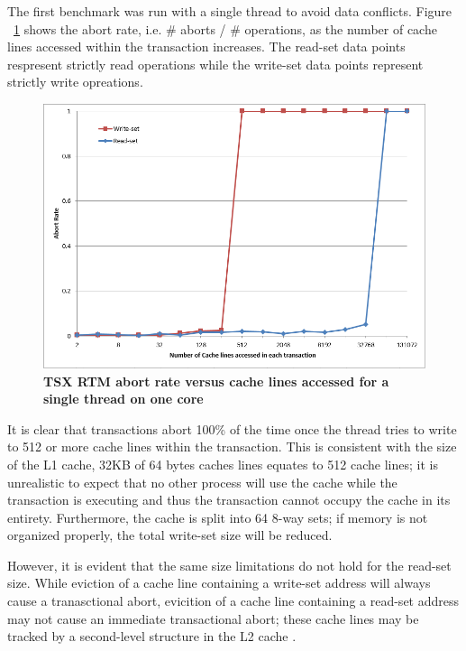 \documentclass[a4paper]{article}
\begin{document}
\indent
The first benchmark was run with a single thread to avoid data conflicts.  Figure
~\ref{fig:trx_size} shows the abort rate, i.e. \# aborts / \# operations, as the
number of cache lines accessed within the transaction increases.  The read-set
data points respresent strictly read operations while the write-set data points
represent strictly write opreations.
\par 

\begin{figure}[H]
    \centering
    \graphicspath{ {./figures/} }
    \includegraphics[width=\textwidth,height=\textheight,keepaspectratio]{trx_size}
    \caption{\textbf{TSX RTM abort rate versus cache lines accessed for a single
    thread on one core}}
    \label{fig:trx_size}
\end{figure}

\indent
It is clear that transactions abort 100\% of the time once the thread tries to
write to 512 or more cache lines within the transaction.  This is consistent
with the size of the L1 cache, 32KB of 64 bytes caches lines equates to 512
cache lines; it is unrealistic to expect that no other process will use the
cache while the transaction is executing and thus the transaction cannot occupy
the cache in its entirety.  Furthermore, the cache is split into 64 8-way sets;
if memory is not organized properly, the total write-set size will be reduced.
\par

\indent 
However, it is evident that the same size limitations do not hold for
the read-set size.  While eviction of a cache line containing a write-set address will
always cause a tranasctional abort, evicition of a cache line containing a
read-set address may not cause an immediate transactional abort; these cache
lines may be tracked by a second-level structure in the L2 cache
\cite{intel_opt_man}.
\par
\end{document}

